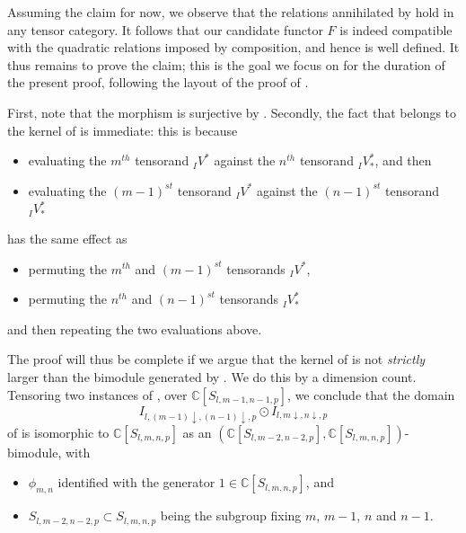 \documentclass[11pt]{article}
\theoremstyle{plain}
\theoremstyle{nonumberplain}
\theoremstyle{plain}
\numberwithin{equation}{section}
\theoremstyle{nonumberplain}
\newcommand\bC{{\mathbb C}}
\newcommand\1{{\bf 1}}
\begin{document}
\begin{th:sl-univ}[sketch]
  Assuming the claim for now, we observe that the relations annihilated by  hold in any tensor category. It follows that our candidate functor $F$ is indeed compatible with the quadratic relations imposed by composition, and hence is well defined. It thus remains to prove the claim; this is the goal we focus on for the duration of the present proof, following the layout of the proof of \cite[Lemma 3.27 (a)]{us0}.

  First, note that the morphism  is surjective by . Secondly, the fact that  belongs to the kernel of  is immediate: this is because %
  \begin{itemize}
  \item[$-$] evaluating the $m^{th}$ tensorand ${}_IV^*$ against the $n^{th}$ tensorand ${}_IV_*^*$, and then
  \item[$-$] evaluating the $(m-1)^{st}$  tensorand ${}_IV^*$ against the $(n-1)^{st}$  tensorand ${}_IV_*^*$
  \end{itemize}

  has the same effect as

  \begin{itemize}
  \item[$-$] permuting the $m^{th}$ and $(m-1)^{st}$ tensorands ${}_IV^*$,
  \item[$-$] permuting the $n^{th}$ and $(n-1)^{st}$ tensorands ${}_IV_*^*$
  \end{itemize}
  and then repeating the two evaluations above.

  The proof will thus be complete if we argue that the kernel of  is not {\it strictly} larger than the bimodule generated by . We do this by a dimension count. Tensoring two instances of ,  over $\bC [S_{l,m-1,n-1,p}]$, we conclude that the domain
  \begin{equation*}
    I_{l,(m-1)\downarrow,(n-1)\downarrow,p}\odot I_{l,m\downarrow,n\downarrow,p}
  \end{equation*}
  of  is isomorphic to $\bC [S_{l,m,n,p}]$ as an $(\bC[S_{l,m-2,n-2,p}],\bC[S_{l,m,n,p}])$-bimodule, with
  \begin{itemize}
  \item[$-$] $\phi_{m,n}$ identified with the generator $1\in \bC [S_{l,m,n,p}]$, and
  \item[$-$] $S_{l,m-2,n-2,p}\subset S_{l,m,n,p}$ being the subgroup fixing $m$, $m-1$, $n$ and $n-1$. 
  \end{itemize}


\end{th:sl-univ}
\end{document}
